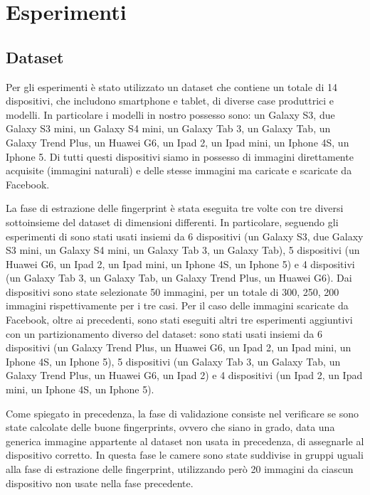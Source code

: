 \section{Esperimenti}

\subsection{Dataset}

Per gli esperimenti è stato utilizzato un dataset che contiene un totale di 14 dispositivi, che includono smartphone e tablet, di diverse case produttrici e modelli. In particolare i modelli in nostro possesso sono: un Galaxy S3, due Galaxy S3 mini, un Galaxy S4 mini, un Galaxy Tab 3, un Galaxy Tab, un Galaxy Trend Plus, un Huawei G6, un Ipad 2, un Ipad mini, un Iphone 4S, un Iphone 5. Di tutti questi dispositivi siamo in possesso di immagini direttamente acquisite (immagini naturali) e delle stesse immagini ma caricate e scaricate da Facebook.

La fase di estrazione delle fingerprint è stata eseguita tre volte con tre diversi sottoinsieme del dataset di dimensioni differenti. In particolare, seguendo gli esperimenti di \cite{ Amerini2014831} sono stati usati insiemi da 6 dispositivi (un Galaxy S3, due Galaxy S3 mini, un Galaxy S4 mini, un Galaxy Tab 3, un Galaxy Tab), 5 dispositivi (un Huawei G6, un Ipad 2, un Ipad mini, un Iphone 4S, un Iphone 5) e 4 dispositivi (un Galaxy Tab 3, un Galaxy Tab, un Galaxy Trend Plus, un Huawei G6). Dai dispositivi sono state selezionate 50 immagini, per un totale di 300, 250, 200 immagini rispettivamente per i tre casi.
Per il caso delle immagini scaricate da Facebook, oltre ai precedenti, sono stati eseguiti altri tre esperimenti aggiuntivi con un partizionamento diverso del dataset: sono stati usati insiemi da 6 dispositivi (un Galaxy Trend Plus, un Huawei G6, un Ipad 2, un Ipad mini, un Iphone 4S, un Iphone 5), 5 dispositivi (un Galaxy Tab 3, un Galaxy Tab, un Galaxy Trend Plus, un Huawei G6, un Ipad 2) e 4 dispositivi (un Ipad 2, un Ipad mini, un Iphone 4S, un Iphone 5).

Come spiegato in precedenza, la fase di validazione consiste nel verificare se sono state calcolate delle buone fingerprints, ovvero che siano in grado, data una generica immagine appartente al dataset non usata in precedenza, di assegnarle al dispositivo corretto. In questa fase le camere sono state suddivise in gruppi uguali alla fase di estrazione delle fingerprint, utilizzando però 20 immagini da ciascun dispositivo non usate nella fase precedente.

